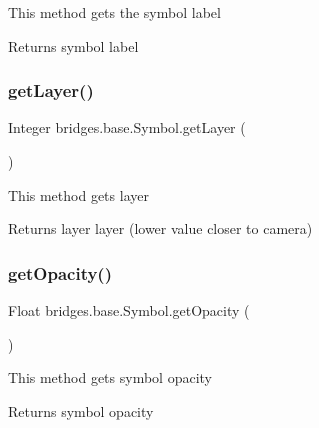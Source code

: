This method gets the symbol label

\begin{DoxyReturn}{Returns}
symbol label 
\end{DoxyReturn}
\mbox{\label{classbridges_1_1base_1_1_symbol_ac5048d3027a5ba930ad66c490b55e2e6}} 
\subsubsection{\texorpdfstring{get\+Layer()}{getLayer()}}
{\footnotesize\ttfamily Integer bridges.\+base.\+Symbol.\+get\+Layer (\begin{DoxyParamCaption}{ }\end{DoxyParamCaption})}

This method gets layer

\begin{DoxyReturn}{Returns}
layer layer (lower value closer to camera) 
\end{DoxyReturn}
\mbox{\label{classbridges_1_1base_1_1_symbol_a0135a9633599ee1a463f7bd83c425d02}} 
\subsubsection{\texorpdfstring{get\+Opacity()}{getOpacity()}}
{\footnotesize\ttfamily Float bridges.\+base.\+Symbol.\+get\+Opacity (\begin{DoxyParamCaption}{ }\end{DoxyParamCaption})}

This method gets symbol opacity

\begin{DoxyReturn}{Returns}
symbol opacity 
\end{DoxyReturn}
\mbox{\label{classbridges_1_1base_1_1_symbol_a10f3cde5331f1af9303b08249e719a9d}} 
